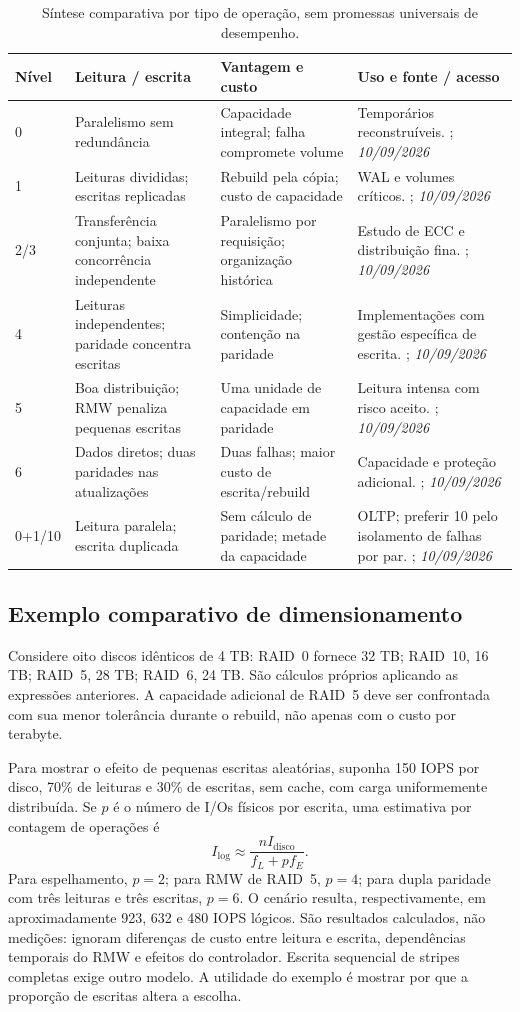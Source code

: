 \documentclass[titlepage]{article}
\newcommand{\acesso}{\textit{10/09/2026}}
\begin{document}
\begin{table}[htbp]
\centering\footnotesize
\begin{tabularx}{\textwidth}{lXXX}
\toprule
Nível & Leitura / escrita & Vantagem e custo & Uso e fonte / acesso \\
\midrule
0 & Paralelismo sem redundância & Capacidade integral; falha compromete volume & Temporários reconstruíveis. \cite{redhat_raid}; \acesso \\
1 & Leituras divididas; escritas replicadas & Rebuild pela cópia; custo de capacidade & WAL e volumes críticos. \cite{silberschatz2020}; \acesso \\
2/3 & Transferência conjunta; baixa concorrência independente & Paralelismo por requisição; organização histórica & Estudo de ECC e distribuição fina. \cite{patterson1988}; \acesso \\
4 & Leituras independentes; paridade concentra escritas & Simplicidade; contenção na paridade & Implementações com gestão específica de escrita. \cite{redhat_raid}; \acesso \\
5 & Boa distribuição; RMW penaliza pequenas escritas & Uma unidade de capacidade em paridade & Leitura intensa com risco aceito. \cite{raid5_io}; \acesso \\
6 & Dados diretos; duas paridades nas atualizações & Duas falhas; maior custo de escrita/rebuild & Capacidade e proteção adicional. \cite{plank2008}; \acesso \\
0+1/10 & Leitura paralela; escrita duplicada & Sem cálculo de paridade; metade da capacidade & OLTP; preferir 10 pelo isolamento de falhas por par. \cite{dbbook_storage}; \acesso \\
\bottomrule
\end{tabularx}
\caption{Síntese comparativa por tipo de operação, sem promessas universais de desempenho.}
\end{table}

\subsection{Exemplo comparativo de dimensionamento}
Considere oito discos idênticos de 4 TB: RAID~0 fornece 32 TB; RAID~10, 16 TB; RAID~5, 28 TB; RAID~6, 24 TB. São cálculos próprios aplicando as expressões anteriores. A capacidade adicional de RAID~5 deve ser confrontada com sua menor tolerância durante o rebuild, não apenas com o custo por terabyte.

Para mostrar o efeito de pequenas escritas aleatórias, suponha 150 IOPS por disco, 70\% de leituras e 30\% de escritas, sem cache, com carga uniformemente distribuída. Se $p$ é o número de I/Os físicos por escrita, uma estimativa por contagem de operações é
\[
I_{\mathrm{log}}\approx\frac{nI_{\mathrm{disco}}}{f_L+p f_E}.
\]
Para espelhamento, $p=2$; para RMW de RAID~5, $p=4$; para dupla paridade com três leituras e três escritas, $p=6$. O cenário resulta, respectivamente, em aproximadamente 923, 632 e 480 IOPS lógicos. São resultados calculados, não medições: ignoram diferenças de custo entre leitura e escrita, dependências temporais do RMW e efeitos do controlador. Escrita sequencial de stripes completas exige outro modelo. A utilidade do exemplo é mostrar por que a proporção de escritas altera a escolha.
\end{document}

